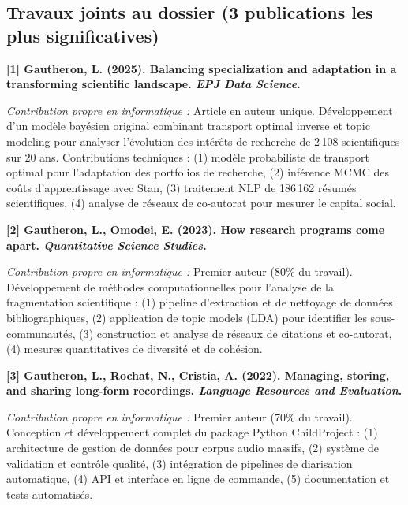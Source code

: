 \documentclass[11pt,a4paper]{article}
\begin{document}
\subsection{Travaux joints au dossier (3 publications les plus significatives)}

\noindent\textbf{[1] Gautheron, L. (2025). Balancing specialization and adaptation in a transforming scientific landscape. \textit{EPJ Data Science}.}

\textit{Contribution propre en informatique :} Article en auteur unique. Développement d'un modèle bayésien original combinant transport optimal inverse et topic modeling pour analyser l'évolution des intérêts de recherche de 2\,108 scientifiques sur 20 ans. Contributions techniques : (1) modèle probabiliste de transport optimal pour l'adaptation des portfolios de recherche, (2) inférence MCMC des coûts d'apprentissage avec Stan, (3) traitement NLP de 186\,162 résumés scientifiques, (4) analyse de réseaux de co-autorat pour mesurer le capital social.

\vspace{0.3cm}

\noindent\textbf{[2] Gautheron, L., Omodei, E. (2023). How research programs come apart. \textit{Quantitative Science Studies}.}

\textit{Contribution propre en informatique :} Premier auteur (80\% du travail). Développement de méthodes computationnelles pour l'analyse de la fragmentation scientifique : (1) pipeline d'extraction et de nettoyage de données bibliographiques, (2) application de topic models (LDA) pour identifier les sous-communautés, (3) construction et analyse de réseaux de citations et co-autorat, (4) mesures quantitatives de diversité et de cohésion.

\vspace{0.3cm}

\noindent\textbf{[3] Gautheron, L., Rochat, N., Cristia, A. (2022). Managing, storing, and sharing long-form recordings. \textit{Language Resources and Evaluation}.}

\textit{Contribution propre en informatique :} Premier auteur (70\% du travail). Conception et développement complet du package Python ChildProject : (1) architecture de gestion de données pour corpus audio massifs, (2) système de validation et contrôle qualité, (3) intégration de pipelines de diarisation automatique, (4) API et interface en ligne de commande, (5) documentation et tests automatisés.

\end{document}
